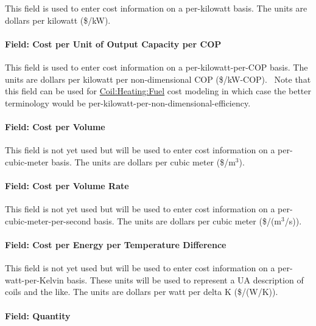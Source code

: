 This field is used to enter cost information on a per-kilowatt basis. The units are dollars per kilowatt (\$/kW).

\paragraph{Field: Cost per Unit of Output Capacity per COP}\label{field-cost-per-unit-of-output-capacity-per-cop}

This field is used to enter cost information on a per-kilowatt-per-COP basis. The units are dollars per kilowatt per non-dimensional COP (\$/kW-COP).~ Note that this field can be used for \hyperref[coilheatinggas-000]{Coil:Heating:Fuel} cost modeling in which case the better terminology would be per-kilowatt-per-non-dimensional-efficiency.

\paragraph{Field: Cost per Volume}\label{field-cost-per-volume}

This field is not yet used but will be used to enter cost information on a per-cubic-meter basis. The units are dollars per cubic meter (\$/m\(^{3}\)).

\paragraph{Field: Cost per Volume Rate}\label{field-cost-per-volume-rate}

This field is not yet used but will be used to enter cost information on a per-cubic-meter-per-second basis. The units are dollars per cubic meter (\$/(m\(^{3}\)/s)).

\paragraph{Field: Cost per Energy per Temperature Difference}\label{field-cost-per-energy-per-temperature-difference}

This field is not yet used but will be used to enter cost information on a per-watt-per-Kelvin basis. These units will be used to represent a UA description of coils and the like. The units are dollars per watt per delta K (\$/(W/K)).

\paragraph{Field: Quantity}\label{field-quantity}

